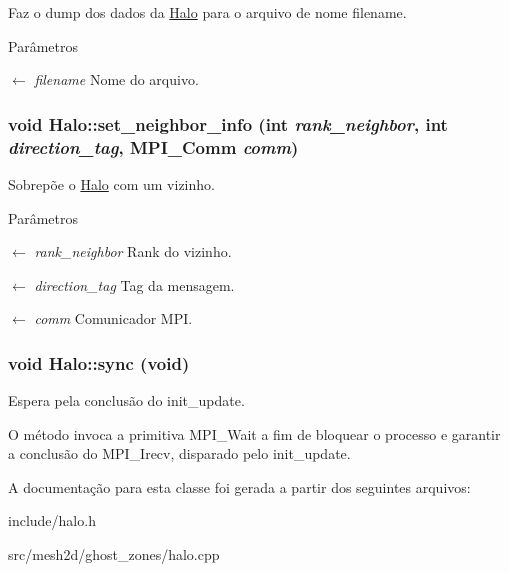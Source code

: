 Faz o dump dos dados da \hyperlink{classHalo}{Halo} para o arquivo de nome filename. 


\begin{DoxyParams}{Parâmetros}
\item[\mbox{$\leftarrow$} {\em filename}]Nome do arquivo. \end{DoxyParams}
\hypertarget{classHalo_a38eff5fb365854da750295ffb7bcab39}{
\subsubsection[{set\_\-neighbor\_\-info}]{\setlength{\rightskip}{0pt plus 5cm}void Halo::set\_\-neighbor\_\-info (int {\em rank\_\-neighbor}, \/  int {\em direction\_\-tag}, \/  MPI\_\-Comm {\em comm})}}
\label{classHalo_a38eff5fb365854da750295ffb7bcab39}


Sobrepõe o \hyperlink{classHalo}{Halo} com um vizinho. 


\begin{DoxyParams}{Parâmetros}
\item[\mbox{$\leftarrow$} {\em rank\_\-neighbor}]Rank do vizinho. \item[\mbox{$\leftarrow$} {\em direction\_\-tag}]Tag da mensagem. \item[\mbox{$\leftarrow$} {\em comm}]Comunicador MPI. \end{DoxyParams}
\hypertarget{classHalo_aff104eacb831738e61d54855a3259b37}{
\subsubsection[{sync}]{\setlength{\rightskip}{0pt plus 5cm}void Halo::sync (void)}}
\label{classHalo_aff104eacb831738e61d54855a3259b37}


Espera pela conclusão do init\_\-update. 

O método invoca a primitiva MPI\_\-Wait a fim de bloquear o processo e garantir a conclusão do MPI\_\-Irecv, disparado pelo init\_\-update. 

A documentação para esta classe foi gerada a partir dos seguintes arquivos:\begin{DoxyCompactItemize}
\item 
include/halo.h\item 
src/mesh2d/ghost\_\-zones/halo.cpp\end{DoxyCompactItemize}
